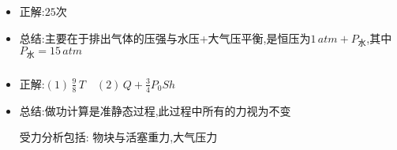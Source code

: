 \documentclass{article}
\begin{document}
\vspace{2em}

\subsubsection{}
\begin{itemize}
    \item 正解:\quad $25$次
    \item 总结:\quad 主要在于排出气体的压强与水压+大气压平衡,是恒压为$1 \, atm + P_{\text{水}}$,其中$P_{\text{水}} = 15 \, atm$
\end{itemize}

\vspace{2em}

\subsubsection{}
\begin{itemize}
    \item 正解:\quad $(1) \, \frac{9}{8} \, T \quad (2) \,  Q + \frac{3}{4}P_{0}Sh$
    \item 总结:\quad 做功计算是准静态过程,此过程中所有的力视为不变
    
    \hspace{3.2em}受力分析包括: 物块与活塞重力,大气压力
\end{itemize}
\end{document}

